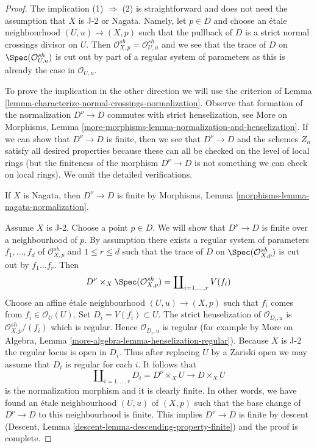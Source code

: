 \begin{proof}
The implication (1) $\Rightarrow$ (2) is straightforward and
does not need the assumption that $X$ is J-2 or Nagata.
Namely, let $p \in D$ and choose an \'etale neighbourhood
$(U, u) \to (X, p)$ such that the pullback of $D$ is
a strict normal crossings divisor on $U$.
Then $\mathcal{O}_{X, p}^{sh} = \mathcal{O}_{U, u}^{sh}$
and we see that the trace of $D$ on $\Spec(\mathcal{O}_{U, u}^{sh})$
is cut out by part of a regular system of parameters
as this is already the case in $\mathcal{O}_{U, u}$.

\medskip\noindent
To prove the implication in the other direction
we will use the criterion of
Lemma \ref{lemma-characterize-normal-crossings-normalization}.
Observe that formation of the normalization $D^\nu \to D$
commutes with strict henselization, see
More on Morphisms, Lemma
\ref{more-morphisms-lemma-normalization-and-henselization}.
If we can show that $D^\nu \to D$ is finite,
then we see that $D^\nu \to D$ and the schemes
$Z_n$ satisfy all desired properties because these
can all be checked on the level of local rings
(but the finiteness of the morphism $D^\nu \to D$
is not something we can check on local rings).
We omit the detailed verifications.

\medskip\noindent
If $X$ is Nagata, then $D^\nu \to D$ is finite by
Morphisms, Lemma \ref{morphisms-lemma-nagata-normalization}.

\medskip\noindent
Assume $X$ is J-2. Choose a point $p \in D$. We will show
that $D^\nu \to D$ is finite over a neighbourhood of $p$.
By assumption there exists a regular system of
parameters $f_1, \ldots, f_d$ of $\mathcal{O}_{X, p}^{sh}$
and $1 \leq r \leq d$ such that the trace of $D$ on
$\Spec(\mathcal{O}_{X, p}^{sh})$ is cut out by $f_1 \ldots f_r$.
Then
$$
D^\nu \times_X \Spec(\mathcal{O}_{X, p}^{sh}) = 
\coprod\nolimits_{i = 1, \ldots, r} V(f_i)
$$
Choose an affine \'etale neighbourhood
$(U, u) \to (X, p)$ such that $f_i$ comes from
$f_i \in \mathcal{O}_U(U)$. Set $D_i = V(f_i) \subset U$.
The strict henselization of $\mathcal{O}_{D_i, u}$
is $\mathcal{O}_{X, p}^{sh}/(f_i)$ which is regular.
Hence $\mathcal{O}_{D_i, u}$ is regular (for example by
More on Algebra, Lemma \ref{more-algebra-lemma-henselization-regular}).
Because $X$ is J-2 the regular locus is open in $D_i$.
Thus after replacing $U$ by a Zariski open we may assume
that $D_i$ is regular for each $i$. It follows that
$$
\coprod\nolimits_{i = 1, \ldots, r} D_i = D^\nu \times_X U
\longrightarrow D \times_X U
$$
is the normalization morphism and it is clearly finite.
In other words, we have found
an \'etale neighbourhood $(U, u)$ of $(X, p)$ such that
the base change of $D^\nu \to D$ to this neighbourhood is finite.
This implies $D^\nu \to D$ is finite by descent
(Descent, Lemma \ref{descent-lemma-descending-property-finite})
and the proof is complete.
\end{proof}













